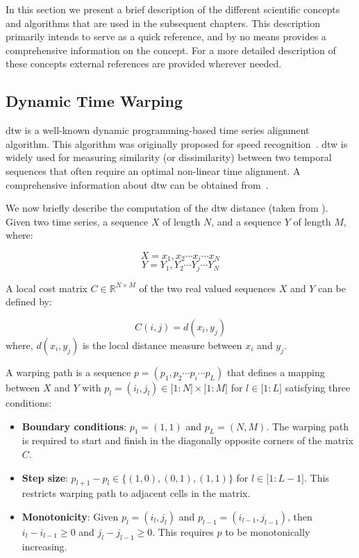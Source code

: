 In this section we present a brief description of the different scientific concepts and algorithms that are used in the subsequent chapters. This description primarily intends to serve as a quick reference, and by no means provides a comprehensive information on the concept. For a more detailed description of these concepts external references are provided wherever needed.


\subsection{Dynamic Time Warping}
\label{sec_background_distance_measure}

\Acrfull{dtw} is a well-known dynamic programming-based time series alignment algorithm. This algorithm was originally proposed for speed recognition~\citep{Sakoe78TASLP}. \Gls{dtw} is widely used for measuring similarity (or dissimilarity) between two temporal sequences that often require an optimal non-linear time alignment. A comprehensive information about \gls{dtw} can be obtained from~\cite{muller2007dynamic}. 

We now briefly describe the computation of the \gls{dtw} distance (taken from \cite{Keogh2004,muller2007dynamic}). Given two time series, a sequence  $X$ of length $N$, and a sequence $Y$ of length $M$, where:

\begin{equation}
	X = x_1, x_2 \cdots x_i \cdots x_N
\end{equation}
\begin{equation}
	Y = Y_1, Y_2 \cdots Y_j \cdots Y_N
\end{equation}

\noindent A local cost matrix $C \in \mathbb{R}^{N \times M}$ of the two real valued sequences $X$ and $Y$ can be defined by:

\begin{equation}
C(i,j) = d(x_i,y_j)
\end{equation}
\noindent where, $d(x_i,y_j)$ is the local distance measure between $x_i$ and $y_j$.

A warping path is a sequence $p = (p_1, p_2 \cdots p_i \cdots p_L)$ that defines a mapping between $X$ and $Y$ with $p_l = (i_l, j_l) \in \lbrack 1:N\rbrack \times \lbrack1:M\rbrack$ for $ l \in \lbrack1:L\rbrack$ satisfying three conditions:

\begin{itemize}
	\item \textbf{Boundary conditions}: $p_1 = (1, 1)$ and $p_L = (N, M)$. The warping path is required to start and finish in the diagonally opposite corners of the matrix $C$.
	\item \textbf{Step size}: $p_{l+1}-p_l \in \lbrace (1,0), (0,1), (1,1) \rbrace$ for $l \in \lbrack 1: L-1 \rbrack$. This restricts warping path to adjacent cells in the matrix.
	\item \textbf{Monotonicity}: Given $p_l = (i_l, j_l)$ and $p_{l-1} = (i_{l-1}, j_{l-1})$, then $i_l - i_{l-1} \geq 0$ and $j_l - j_{l-1} \geq 0$. This requires $p$ to be monotonically increasing.
\end{itemize}

